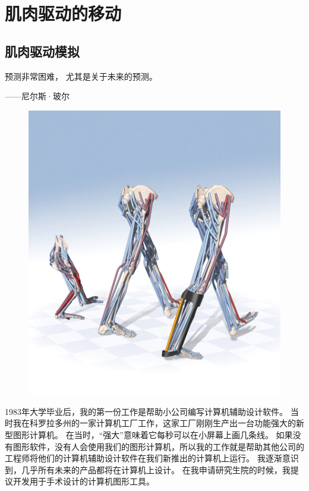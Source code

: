 \part{肌肉驱动的移动}

\chapter{肌肉驱动模拟} \label{chap:chap10}

预测非常困难，
尤其是关于未来的预测。
\begin{flushright}
	——尼尔斯·玻尔
\end{flushright}

\begin{figure}[!htb]
	\centering
	\includegraphics[width=0.9\linewidth]{chap10/10_0}
	\caption*{ \label{fig:10_0}}
\end{figure}

1983年大学毕业后，我的第一份工作是帮助小公司编写计算机辅助设计软件。
当时我在科罗拉多州的一家计算机工厂工作，这家工厂刚刚生产出一台功能强大的新型图形计算机。
在当时，“强大”意味着它每秒可以在小屏幕上画几条线。
如果没有图形软件，没有人会使用我们的图形计算机，所以我的工作就是帮助其他公司的工程师将他们的计算机辅助设计软件在我们新推出的计算机上运行。
我逐渐意识到，几乎所有未来的产品都将在计算机上设计。
在我申请研究生院的时候，我提议开发用于手术设计的计算机图形工具。



